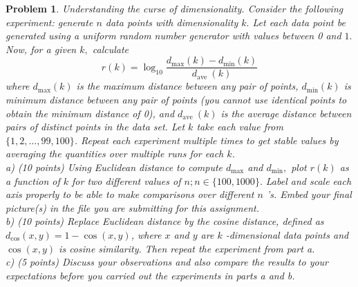 \documentclass[12pt]{article}
\newtheorem{problem}{Problem}
\begin{document}
\begin{problem}
Understanding the curse of dimensionality. Consider the following experiment:
generate $n$ data points with dimensionality $k .$ Let each data point be generated using a uniform random number generator with values between 0 and $1 .$ Now, for a given $k,$ calculate
$$
r(k)=\log _{10} \frac{d_{\max }(k)-d_{\min }(k)}{d_{\text {ave }}(k)}
$$
where $d_{\max }(k)$ is the maximum distance between any pair of points, $d_{\min }(k)$ is minimum distance between any pair of points (you cannot use identical points to obtain the minimum distance of 0), and $d_{\text {ave }}(k)$ is the average distance between pairs of distinct points in the data set. Let $k$ take each value from $\{1,2, \ldots, 99,100\}$. Repeat each experiment multiple times to get stable values by averaging the quantities over multiple runs for each $k$.\\
a) (10 points) Using Euclidean distance to compute $d_{\max }$ and $d_{\min },$ plot $r(k)$ as a function of $k$ for two different values of $n ; n \in\{100,1000\} .$ Label and scale each axis properly to be able to make comparisons over different $n$ 's. Embed your final picture(s) in the file you are submitting for this assignment.\\
b) (10 points) Replace Euclidean distance by the cosine distance, defined as $d_{\cos }(x, y)=1-\cos (x, y)$, where $x$ and $y$ are $k$ -dimensional data points and $\cos (x, y)$ is cosine similarity. Then repeat the experiment from part a.\\
c) (5 points) Discuss your observations and also compare the results to your expectations before you carried out the experiments in parts a and b.
\end{problem}
\end{document}
